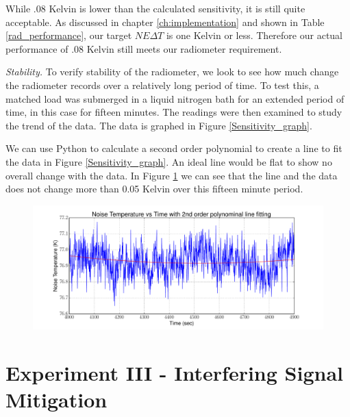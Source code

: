 While .08 Kelvin is lower than the calculated sensitivity, it is still quite acceptable.  As discussed in chapter \ref{ch:implementation} and shown in Table \ref{rad_performance}, our target $NE\Delta T$ is one Kelvin or less.  Therefore our actual performance of .08 Kelvin still meets our radiometer requirement.

\emph{Stability.}  To verify stability of the radiometer, we look to see how much change the radiometer records over a relatively long period of time.  To test this, a matched load was submerged in a liquid nitrogen bath for an extended period of time, in this case for fifteen minutes.  The readings were then examined to study the trend of the data.  The data is graphed in Figure \ref{Sensitivity_graph}.


We can use Python to calculate a second order polynomial to create a line to fit the data in Figure \ref{Sensitivity_graph}.  An ideal line would be flat to show no overall change with the data.  In Figure \ref{Stability_calib} we can see that the line and the data does not change more than 0.05 Kelvin over this fifteen minute period.

\begin{figure}[h!tb] \centering
\includegraphics[width=\textwidth]{Experiments/Exp2/calib_line_fitting.pdf}
\label{Stability_calib}
\end{figure}

\section{Experiment III - Interfering Signal Mitigation} \label{Exp3_results}

